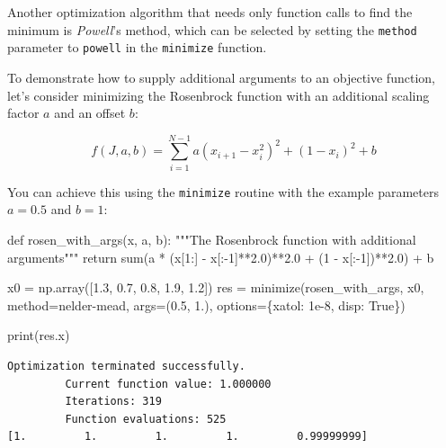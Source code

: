 \documentclass[
  letterpaper,
  DIV=11,
  numbers=noendperiod]{scrreprt}
\newenvironment{Shaded}{\begin{snugshade}}{\end{snugshade}}
\newcommand{\BuiltInTok}[1]{\textcolor[rgb]{0.00,0.23,0.31}{#1}}
\newcommand{\CommentTok}[1]{\textcolor[rgb]{0.37,0.37,0.37}{#1}}
\newcommand{\ControlFlowTok}[1]{\textcolor[rgb]{0.00,0.23,0.31}{#1}}
\newcommand{\DecValTok}[1]{\textcolor[rgb]{0.68,0.00,0.00}{#1}}
\newcommand{\FloatTok}[1]{\textcolor[rgb]{0.68,0.00,0.00}{#1}}
\newcommand{\KeywordTok}[1]{\textcolor[rgb]{0.00,0.23,0.31}{#1}}
\newcommand{\NormalTok}[1]{\textcolor[rgb]{0.00,0.23,0.31}{#1}}
\newcommand{\OperatorTok}[1]{\textcolor[rgb]{0.37,0.37,0.37}{#1}}
\newcommand{\StringTok}[1]{\textcolor[rgb]{0.13,0.47,0.30}{#1}}
\newcommand{\VariableTok}[1]{\textcolor[rgb]{0.07,0.07,0.07}{#1}}
\begin{document}
Another optimization algorithm that needs only function calls to find
the minimum is \emph{Powell}'s method, which can be selected by setting
the \texttt{method} parameter to
\texttt{\textquotesingle{}powell\textquotesingle{}} in the
\texttt{minimize} function.

To demonstrate how to supply additional arguments to an objective
function, let's consider minimizing the Rosenbrock function with an
additional scaling factor \(a\) and an offset \(b\):

\[
f(J, a, b) = \sum_{i=1}^{N-1} a (x_{i+1} - x_i^2)^2 + (1 - x_i)^2 + b
\]

You can achieve this using the \texttt{minimize} routine with the
example parameters \(a=0.5\) and \(b=1\):

\begin{Shaded}
\begin{Highlighting}[]
\KeywordTok{def}\NormalTok{ rosen\_with\_args(x, a, b):}
    \CommentTok{"""The Rosenbrock function with additional arguments"""}
    \ControlFlowTok{return} \BuiltInTok{sum}\NormalTok{(a }\OperatorTok{*}\NormalTok{ (x[}\DecValTok{1}\NormalTok{:] }\OperatorTok{{-}}\NormalTok{ x[:}\OperatorTok{{-}}\DecValTok{1}\NormalTok{]}\OperatorTok{**}\FloatTok{2.0}\NormalTok{)}\OperatorTok{**}\FloatTok{2.0} \OperatorTok{+}\NormalTok{ (}\DecValTok{1} \OperatorTok{{-}}\NormalTok{ x[:}\OperatorTok{{-}}\DecValTok{1}\NormalTok{])}\OperatorTok{**}\FloatTok{2.0}\NormalTok{) }\OperatorTok{+}\NormalTok{ b}

\NormalTok{x0 }\OperatorTok{=}\NormalTok{ np.array([}\FloatTok{1.3}\NormalTok{, }\FloatTok{0.7}\NormalTok{, }\FloatTok{0.8}\NormalTok{, }\FloatTok{1.9}\NormalTok{, }\FloatTok{1.2}\NormalTok{])}
\NormalTok{res }\OperatorTok{=}\NormalTok{ minimize(rosen\_with\_args, x0, method}\OperatorTok{=}\StringTok{\textquotesingle{}nelder{-}mead\textquotesingle{}}\NormalTok{,}
\NormalTok{               args}\OperatorTok{=}\NormalTok{(}\FloatTok{0.5}\NormalTok{, }\FloatTok{1.}\NormalTok{), options}\OperatorTok{=}\NormalTok{\{}\StringTok{\textquotesingle{}xatol\textquotesingle{}}\NormalTok{: }\FloatTok{1e{-}8}\NormalTok{, }\StringTok{\textquotesingle{}disp\textquotesingle{}}\NormalTok{: }\VariableTok{True}\NormalTok{\})}

\BuiltInTok{print}\NormalTok{(res.x)}
\end{Highlighting}
\end{Shaded}

\begin{verbatim}
Optimization terminated successfully.
         Current function value: 1.000000
         Iterations: 319
         Function evaluations: 525
[1.         1.         1.         1.         0.99999999]
\end{verbatim}
\end{document}
